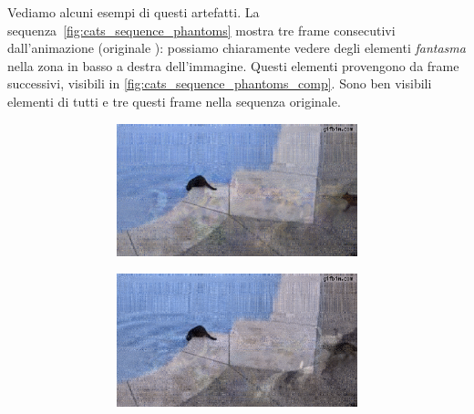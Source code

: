 \documentclass[11pt,a4paper]{article}
\begin{document}
Vediamo alcuni esempi di questi artefatti. La sequenza~\ref{fig:cats_sequence_phantoms} mostra tre frame consecutivi dall'animazione \href{http://poisson.phc.unipi.it/~bianucci/shared/tesi/cats_TT.gif}{} (originale \href{http://poisson.phc.unipi.it/~bianucci/shared/tesi/cats.gif}{}): possiamo chiaramente vedere degli elementi \emph{fantasma} nella zona in basso a destra dell'immagine. Questi elementi provengono da frame successivi, visibili in \ref{fig:cats_sequence_phantoms_comp}. Sono ben visibili elementi di tutti e tre questi frame nella sequenza originale.

\begin{figure}
  \centering
  \def\wid{0.48}
  \def\scal{0.44}
  \begin{subfigure}[]{\wid\textwidth}
    \begin{subfigure}[]{\wid\textwidth}
      \centering
      \includegraphics[keepaspectratio=true, scale=\scal]{Imgs/Cats/frame-10}
    \end{subfigure}
    
    \begin{subfigure}[]{\wid\textwidth}
      \centering
      \includegraphics[keepaspectratio=true, scale=\scal]{Imgs/Cats/frame-11}
    \end{subfigure}
    

\end{subfigure}
\end{figure}
\end{document}
